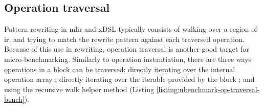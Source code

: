 

\subsection{Operation traversal}
\label{ssec:ubenchmark-operation-traversal}

Pattern rewriting in \ac{mlir} and xDSL typically consists of walking over a region of \ac{ir}, and trying to match the rewrite pattern against each traversed operation.
Because of this use in rewriting, operation traversal is another good target for micro-benchmarking.
Similarly to operation instantiation, there are three ways operations in a block can be traversed: directly iterating over the internal operation array ; directly iterating over the iterable provided by the block ; and using the recursive walk helper method  (Listing \ref{listing:ubenchmark-op-traversal-bench}).

